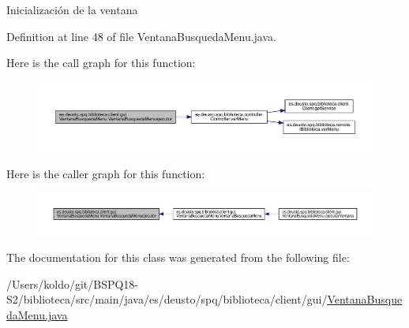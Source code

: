 Inicialización de la ventana 

Definition at line 48 of file Ventana\+Busqueda\+Menu.\+java.

Here is the call graph for this function\+:
\nopagebreak
\begin{figure}[H]
\begin{center}
\leavevmode
\includegraphics[width=350pt]{classes_1_1deusto_1_1spq_1_1biblioteca_1_1client_1_1gui_1_1_ventana_busqueda_menu_a2e14e0da230c4e460dd7e656b53622b0_cgraph}
\end{center}
\end{figure}
Here is the caller graph for this function\+:
\nopagebreak
\begin{figure}[H]
\begin{center}
\leavevmode
\includegraphics[width=350pt]{classes_1_1deusto_1_1spq_1_1biblioteca_1_1client_1_1gui_1_1_ventana_busqueda_menu_a2e14e0da230c4e460dd7e656b53622b0_icgraph}
\end{center}
\end{figure}


The documentation for this class was generated from the following file\+:\begin{DoxyCompactItemize}
\item 
/\+Users/koldo/git/\+B\+S\+P\+Q18-\/\+S2/biblioteca/src/main/java/es/deusto/spq/biblioteca/client/gui/\mbox{\hyperlink{_ventana_busqueda_menu_8java}{Ventana\+Busqueda\+Menu.\+java}}\end{DoxyCompactItemize}
